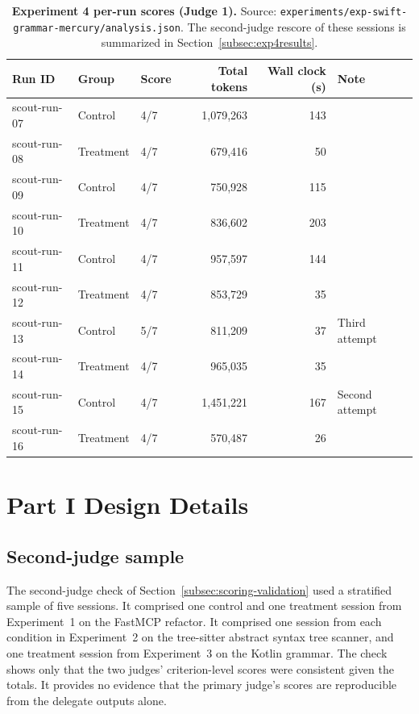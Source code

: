 \documentclass[11pt,a4paper]{article}
\begin{document}
\begin{table}[h]
\centering\small
\caption{\small \textbf{Experiment 4 per-run scores (Judge 1).} Source: \texttt{experiments/exp-swift-grammar-mercury/analysis.json}. The second-judge rescore of these sessions is summarized in Section~\ref{subsec:exp4results}.}
\label{tab:exp4}
\begin{tabular}{lllrrl}
\toprule
Run ID & Group & Score & Total tokens & Wall clock (s) & Note \\
\midrule
scout-run-07 & Control   & 4/7 & 1{,}079{,}263 & 143 & \\
scout-run-08 & Treatment & 4/7 &   679{,}416 &  50 & \\
scout-run-09 & Control   & 4/7 &   750{,}928 & 115 & \\
scout-run-10 & Treatment & 4/7 &   836{,}602 & 203 & \\
scout-run-11 & Control   & 4/7 &   957{,}597 & 144 & \\
scout-run-12 & Treatment & 4/7 &   853{,}729 &  35 & \\
scout-run-13 & Control   & 5/7 &   811{,}209 &  37 & Third attempt \\
scout-run-14 & Treatment & 4/7 &   965{,}035 &  35 & \\
scout-run-15 & Control   & 4/7 & 1{,}451{,}221 & 167 & Second attempt \\
scout-run-16 & Treatment & 4/7 &   570{,}487 &  26 & \\
\bottomrule
\end{tabular}
\end{table}

\section{Part I Design Details}
\label{app:partIdesign}

\subsection{Second-judge sample}

The second-judge check of Section~\ref{subsec:scoring-validation} used a stratified sample of five sessions.
It comprised one control and one treatment session from Experiment~1 on the FastMCP refactor. It comprised one session from each condition in Experiment~2 on the tree-sitter abstract syntax tree scanner, and one treatment session from Experiment~3 on the Kotlin grammar.
The check shows only that the two judges' criterion-level scores were consistent given the totals.
It provides no evidence that the primary judge's scores are reproducible from the delegate outputs alone.
\end{document}
